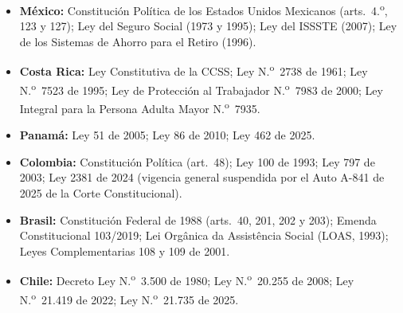 \documentclass[12pt, letterpaper]{article}
\begin{document}
\begin{itemize}
  \item \textbf{México:} Constitución Política de los Estados Unidos Mexicanos
        (arts.\ 4.\textsuperscript{o}, 123 y 127); Ley del Seguro Social (1973 y
        1995); Ley del ISSSTE (2007); Ley de los Sistemas de Ahorro para el
        Retiro (1996).
  \item \textbf{Costa Rica:} Ley Constitutiva de la CCSS;
        Ley N.\textsuperscript{o}~2738 de 1961; Ley N.\textsuperscript{o}~7523 de
        1995; Ley de Protección al Trabajador N.\textsuperscript{o}~7983 de 2000;
        Ley Integral para la Persona Adulta Mayor N.\textsuperscript{o}~7935.
  \item \textbf{Panamá:} Ley 51 de 2005; Ley 86 de 2010; Ley 462 de 2025.
  \item \textbf{Colombia:} Constitución Política (art.\ 48); Ley 100 de 1993;
        Ley 797 de 2003; Ley 2381 de 2024 (vigencia general suspendida por el
        Auto A-841 de 2025 de la Corte Constitucional).
  \item \textbf{Brasil:} Constitución Federal de 1988 (arts.\ 40, 201, 202 y
        203); Emenda Constitucional 103/2019; Lei Orgânica da Assistência Social
        (LOAS, 1993); Leyes Complementarias 108 y 109 de 2001.
  \item \textbf{Chile:} Decreto Ley N.\textsuperscript{o}~3.500 de 1980;
        Ley N.\textsuperscript{o}~20.255 de 2008;
        Ley N.\textsuperscript{o}~21.419 de 2022;
        Ley N.\textsuperscript{o}~21.735 de 2025.
\end{itemize}
\end{document}
